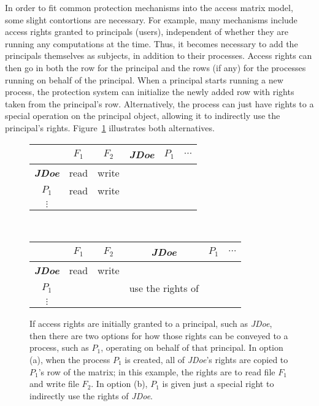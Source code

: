 In order to fit common protection mechanisms into the access matrix
model, some slight contortions are necessary.  For example, many
mechanisms include access rights granted to principals (users),
independent of whether they are running any computations at the time.
Thus, it becomes necessary to add the principals themselves as subjects, in
addition to their processes.  Access rights can then go in both the
row for the principal and the rows (if any) for the processes running
on behalf of the principal.  When a principal starts running a new
process, the protection system can initialize the newly added row with
rights taken from the principal's row. Alternatively, the process can
just have rights to a special operation
on the principal object, allowing it to indirectly use the principal's
rights.
Figure~\ref{access-matrix-principal} illustrates both alternatives.
\begin{figure}
 \begin{tabular}[t]{c||c|c|c|c|c}
&\boldmath$F_1$&\boldmath$F_2$&\textit{\textbf{JDoe}}&\boldmath$P_1$&$\cdots$\\\hline\hline
\textit{\textbf{JDoe}}&read&write&&&\\\hline
\boldmath$P_1$&read&write&&&\\\hline
$\vdots$&&&&&
\end{tabular}\\[1em]
 \begin{tabular}[t]{c||c|c|c|c|c}
&\boldmath$F_1$&\boldmath$F_2$&\textit{\textbf{JDoe}}&\boldmath$P_1$&$\cdots$\\\hline\hline
\textit{\textbf{JDoe}}&read&write&&&\\\hline
\boldmath$P_1$&&&use the rights of&&\\\hline
$\vdots$&&&&&
\end{tabular}
\caption{If access rights are initially granted to a principal, such as
  \textit{JDoe}, then there are two options for how those rights can be
  conveyed to a process, such as $P_1$, operating on behalf of that
  principal.  In option (a), when the process $P_1$ is created, all of
  \textit{JDoe}'s rights are copied to $P_1$'s row of the matrix; in this
  example, the rights are to read file $F_1$ and write file $F_2$.
  In option (b), $P_1$ is given just a special right to
  indirectly use the rights of \textit{JDoe}.}
\label{access-matrix-principal}
\end{figure}

